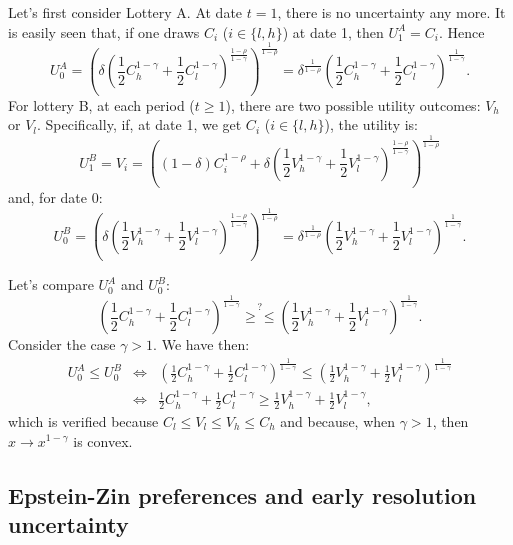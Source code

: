 \documentclass[
  12pt,
]{book}
\theoremstyle{definition}
\theoremstyle{definition}
\theoremstyle{definition}
\theoremstyle{definition}
\theoremstyle{remark}
\begin{document}
Let's first consider Lottery A. At date \(t=1\), there is no uncertainty any more. It is easily seen that, if one draws \(C_i\) (\(i \in \{l,h\}\)) at date 1, then \(U_1^A = C_i\). Hence
\begin{equation}
U_0^A =  \left(\delta \left(\frac{1}{2}C_h^{1-\gamma}+\frac{1}{2}C_l^{1-\gamma}\right)^{\frac{1-\rho}{1-\gamma}}\right)^{\frac{1}{1-\rho}}= \delta^{\frac{1}{1-\rho}} \left(\frac{1}{2}C_h^{1-\gamma}+\frac{1}{2}C_l^{1-\gamma}\right)^{\frac{1}{1-\gamma}}.\label{eq:U0A}
\end{equation}
For lottery B, at each period (\(t\ge1\)), there are two possible utility outcomes: \(V_h\) or \(V_l\). Specifically, if, at date 1, we get \(C_i\) (\(i \in \{l,h\}\)), the utility is:
\begin{equation}
U_1^B = V_i = \left((1-\delta)C_i^{1-\rho} + \delta \left(\frac{1}{2}V_h^{1-\gamma}+\frac{1}{2}V_l^{1-\gamma}\right)^{\frac{1-\rho}{1-\gamma}}\right)^{\frac{1}{1-\rho}}\label{eq:ABCD}
\end{equation}
and, for date 0:
\[
U_0^B =  \left(\delta \left(\frac{1}{2}V_h^{1-\gamma}+\frac{1}{2}V_l^{1-\gamma}\right)^{\frac{1-\rho}{1-\gamma}}\right)^{\frac{1}{1-\rho}}= \delta^{\frac{1}{1-\rho}}\left(\frac{1}{2}V_h^{1-\gamma}+\frac{1}{2}V_l^{1-\gamma}\right)^{\frac{1}{1-\gamma}}.
\]

Let's compare \(U_0^A\) and \(U_0^B\):
\[
\left(\frac{1}{2}C_h^{1-\gamma}+\frac{1}{2}C_l^{1-\gamma}\right)^{\frac{1}{1-\gamma}}
\overset{?}{\ge \le}
\left(\frac{1}{2}V_h^{1-\gamma}+\frac{1}{2}V_l^{1-\gamma}\right)^{\frac{1}{1-\gamma}}.
\]
Consider the case \(\gamma > 1\). We have then:
\begin{eqnarray*}
U_0^A \le U_0^B &\Leftrightarrow& \left(\frac{1}{2}C_h^{1-\gamma}+\frac{1}{2}C_l^{1-\gamma}\right)^{\frac{1}{1-\gamma}} \le \left(\frac{1}{2}V_h^{1-\gamma}+\frac{1}{2}V_l^{1-\gamma}\right)^{\frac{1}{1-\gamma}}\\
&\Leftrightarrow& \frac{1}{2}C_h^{1-\gamma}+\frac{1}{2}C_l^{1-\gamma} \ge \frac{1}{2}V_h^{1-\gamma}+\frac{1}{2}V_l^{1-\gamma},
\end{eqnarray*}
which is verified because \(C_l \le V_l \le V_h \le C_h\) and because, when \(\gamma > 1\), then \(x\rightarrow x^{1-\gamma}\) is convex.

\hypertarget{epstein-zin-preferences-and-early-resolution-uncertainty}{%
\subsection{Epstein-Zin preferences and early resolution uncertainty}\label{epstein-zin-preferences-and-early-resolution-uncertainty}}
\end{document}
